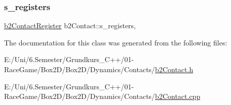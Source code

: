 \subsubsection{\texorpdfstring{s\_registers}{s\_registers}}
{\footnotesize\ttfamily \mbox{\hyperlink{structb2_contact_register}{b2\+Contact\+Register}} b2\+Contact\+::s\+\_\+registers\hspace{0.3cm}{\ttfamily [static]}, {\ttfamily [protected]}}



The documentation for this class was generated from the following files\+:\begin{DoxyCompactItemize}
\item 
E\+:/\+Uni/6.\+Semester/\+Grundkurs\+\_\+\+C++/01-\/\+Race\+Game/\+Box2\+D/\+Box2\+D/\+Dynamics/\+Contacts/\mbox{\hyperlink{b2_contact_8h}{b2\+Contact.\+h}}\item 
E\+:/\+Uni/6.\+Semester/\+Grundkurs\+\_\+\+C++/01-\/\+Race\+Game/\+Box2\+D/\+Box2\+D/\+Dynamics/\+Contacts/\mbox{\hyperlink{b2_contact_8cpp}{b2\+Contact.\+cpp}}\end{DoxyCompactItemize}
